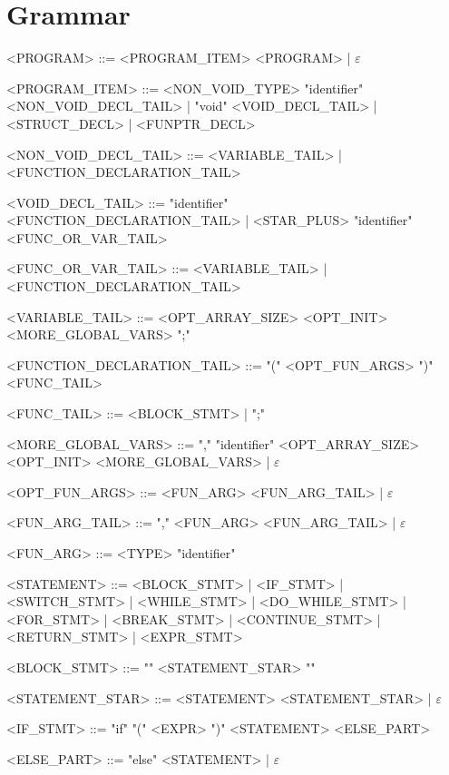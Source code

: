 \chapter{Grammar}

\begin{grammar}
<PROGRAM> ::= <PROGRAM\_ITEM> <PROGRAM> | $\varepsilon$

<PROGRAM\_ITEM> ::= <NON\_VOID\_TYPE> "identifier" <NON\_VOID\_DECL\_TAIL>
                  | "void" <VOID\_DECL\_TAIL>
                  | <STRUCT\_DECL>
                  | <FUNPTR\_DECL>

<NON\_VOID\_DECL\_TAIL> ::= <VARIABLE\_TAIL>
                          | <FUNCTION\_DECLARATION\_TAIL>

<VOID\_DECL\_TAIL> ::= "identifier" <FUNCTION\_DECLARATION\_TAIL>
                     | <STAR\_PLUS> "identifier" <FUNC\_OR\_VAR\_TAIL>

<FUNC\_OR\_VAR\_TAIL> ::= <VARIABLE\_TAIL>
                        | <FUNCTION\_DECLARATION\_TAIL>

<VARIABLE\_TAIL> ::= <OPT\_ARRAY\_SIZE> <OPT\_INIT> <MORE\_GLOBAL\_VARS> ";"

<FUNCTION\_DECLARATION\_TAIL> ::= "(" <OPT\_FUN\_ARGS> ")" <FUNC\_TAIL>

<FUNC\_TAIL> ::= <BLOCK\_STMT>
               | ";"

<MORE\_GLOBAL\_VARS> ::= "," "identifier" <OPT\_ARRAY\_SIZE> <OPT\_INIT> <MORE\_GLOBAL\_VARS>
                       | $\varepsilon$

<OPT\_FUN\_ARGS> ::= <FUN\_ARG> <FUN\_ARG\_TAIL>
                   | $\varepsilon$

<FUN\_ARG\_TAIL> ::= "," <FUN\_ARG> <FUN\_ARG\_TAIL>
                   | $\varepsilon$

<FUN\_ARG> ::= <TYPE> "identifier"

<STATEMENT> ::= <BLOCK\_STMT>
              | <IF\_STMT>
              | <SWITCH\_STMT>
              | <WHILE\_STMT>
              | <DO\_WHILE\_STMT>
              | <FOR\_STMT>
              | <BREAK\_STMT>
              | <CONTINUE\_STMT>
              | <RETURN\_STMT>
              | <EXPR\_STMT>

<BLOCK\_STMT> ::= "{" <STATEMENT\_STAR> "}"

<STATEMENT\_STAR> ::= <STATEMENT> <STATEMENT\_STAR>
                    | $\varepsilon$

<IF\_STMT> ::= "if" "(" <EXPR> ")" <STATEMENT> <ELSE\_PART>

<ELSE\_PART> ::= "else" <STATEMENT>
               | $\varepsilon$


\end{grammar}
